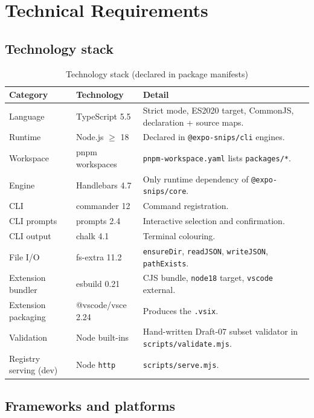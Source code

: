 \chapter{Technical Requirements}
\label{ch:technical-requirements}

\section{Technology stack}

\begin{longtable}{p{3.4cm}p{4.4cm}p{6.6cm}}
\caption{Technology stack (declared in package manifests)}\\
\toprule
\textbf{Category} & \textbf{Technology} & \textbf{Detail} \\
\midrule

Language & TypeScript 5.5 & Strict mode, ES2020 target, CommonJS, declaration + source maps. \\
Runtime & Node.js $\geq$ 18 & Declared in \texttt{@expo-snips/cli} engines. \\
Workspace & pnpm workspaces & \texttt{pnpm-workspace.yaml} lists \texttt{packages/*}. \\
Engine & Handlebars 4.7 & Only runtime dependency of \texttt{@expo-snips/core}. \\
CLI & commander 12 & Command registration. \\
CLI prompts & prompts 2.4 & Interactive selection and confirmation. \\
CLI output & chalk 4.1 & Terminal colouring. \\
File I/O & fs-extra 11.2 & \texttt{ensureDir}, \texttt{readJSON}, \texttt{writeJSON}, \texttt{pathExists}. \\
Extension bundler & esbuild 0.21 & CJS bundle, \texttt{node18} target, \texttt{vscode} external. \\
Extension packaging & @vscode/vsce 2.24 & Produces the \texttt{.vsix}. \\
Validation & Node built-ins & Hand-written Draft-07 subset validator in \texttt{scripts/validate.mjs}. \\
Registry serving (dev) & Node \texttt{http} & \texttt{scripts/serve.mjs}. \\
\bottomrule
\end{longtable}

\section{Frameworks and platforms}

